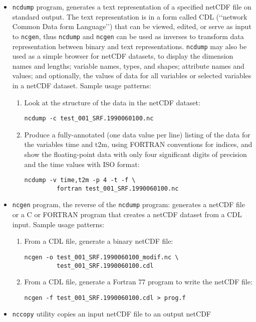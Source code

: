 \begin{itemize}
\item \verb=ncdump= program, generates a text representation of a specified
netCDF file on standard output. The text representation is in a form called
CDL (‘‘network Common Data form Language’’) that can be viewed, edited, or
serve as input to \verb=ncgen=, thus \verb=ncdump= and \verb=ncgen= can be
used as inverses to transform data representation between binary and text
representations. \verb=ncdump= may also be used as a simple browser for netCDF
datasets, to display the dimension names and lengths; variable names, types,
and shapes; attribute names and values; and optionally, the values of data
for all variables or selected variables in a netCDF dataset. 
Sample usage patterns:
\begin{enumerate}
\item Look at the structure of the data in the netCDF dataset:
\begin{Verbatim}
ncdump -c test_001_SRF.1990060100.nc
\end{Verbatim}
\item Produce a fully-annotated (one data value per line) listing of the data
for the variables time and t2m, using FORTRAN conventions for indices, and show
the floating-point data with only four significant digits of precision and the
time values with ISO format:
\begin{Verbatim}
ncdump -v time,t2m -p 4 -t -f \
         fortran test_001_SRF.1990060100.nc
\end{Verbatim}
\end{enumerate}
\item \verb=ncgen= program, the reverse of the \verb=ncdump= program: generates
a netCDF file or a C or FORTRAN program that creates a netCDF dataset from a
CDL input.
Sample usage patterns:
\begin{enumerate}
\item From a CDL file, generate a binary netCDF file:
\begin{Verbatim}
ncgen -o test_001_SRF.1990060100_modif.nc \
         test_001_SRF.1990060100.cdl
\end{Verbatim}
\item From a CDL file, generate a Fortran 77 program to write the netCDF file:
\begin{Verbatim}
ncgen -f test_001_SRF.1990060100.cdl > prog.f
\end{Verbatim}
\end{enumerate}
\item \verb=nccopy= utility copies an input netCDF file to an output netCDF

\end{itemize}
